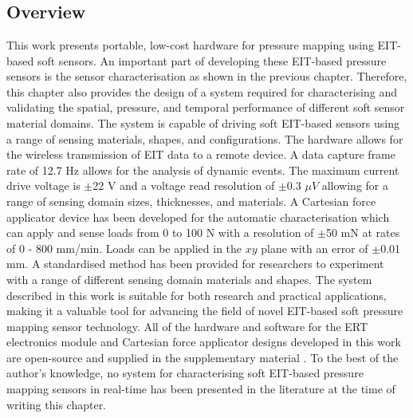 \chapter{\chapvname}
\label{chapter5}
\section*{Overview}
This work presents portable, low-cost hardware for pressure mapping using EIT-based soft sensors. An important part of developing these EIT-based pressure sensors is the sensor characterisation as shown in the previous chapter. Therefore, this chapter also provides the design of a system required for characterising and validating the spatial, pressure, and temporal performance of different soft sensor material domains. The system is capable of driving soft EIT-based sensors using a range of sensing materials, shapes, and configurations. The hardware allows for the wireless transmission of EIT data to a remote device. 
A data capture frame rate of 12.7 Hz allows for the analysis of dynamic events. The maximum current drive voltage is $\pm$22 V and a voltage read resolution of $\pm$0.3 $\mu V$ allowing for a range of sensing domain sizes, thicknesses, and materials. A Cartesian force applicator device has been developed for the automatic characterisation which can apply and sense loads from 0 to 100 N with a resolution of $\pm$50 mN at rates of 0 - 800 mm/min. Loads can be applied in the $xy$ plane with an error of $\pm$0.01 mm. A standardised method has been provided for researchers to experiment with a range of different sensing domain materials and shapes. The system described in this work is suitable for both research and practical applications, making it a valuable tool for advancing the field of novel EIT-based soft pressure mapping sensor technology. All of the hardware and software for the ERT electronics module and Cartesian force applicator designs developed in this work are open-source and supplied in the supplementary material \cite{Ellingham2025}. 
To the best of the author's knowledge, no system for characterising soft EIT-based pressure mapping sensors in real-time has been presented in the literature at the time of writing this chapter.



